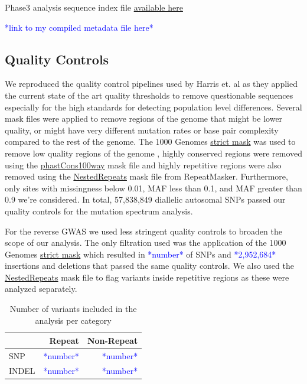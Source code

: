 \documentclass[9pt,lineno]{elife}
\newcommand{\todo}[1]{\textcolor{blue}{*#1*}}
\begin{document}
Phase3 analysis sequence index file  \href{http://ftp.1000genomes.ebi.ac.uk/vol1/ftp/phase3/20130502.phase3.analysis.sequence.index}{available here} 

\todo{link to my compiled metadata file here}

\subsection{Quality Controls}
We reproduced the quality control pipelines used by Harris et. al as they applied the current state of the art quality thresholds to remove questionable sequences especially for the high standards for detecting population level differences. 
Several mask files were applied to remove regions of the genome that might be lower quality, or might have very different mutation rates or base pair complexity compared to the rest of the genome. 
The  1000 Genomes \href{http://ftp.1000genomes.ebi.ac.uk/vol1/ftp/release/20130502/supporting/accessible_genome_masks/20141020.strict_mask.whole_genome.bed}{strict mask} was used to remove low quality regions of the genome , highly conserved regions were removed using the \href{http://hgdownload.cse.ucsc.edu/goldenPath/hg19/database/phastConsElements100way.txt.gz}{phastCons100way} mask file and highly repetitive regions were also removed using the \href{http://hgdownload.cse.ucsc.edu/goldenpath/hg19/database/nestedRepeats.txt.gz}{NestedRepeats} mask file from RepeatMasker. 
Furthermore, only sites with missingness below 0.01, MAF less than 0.1, and MAF greater than 0.9 we're considered.
In total, 57,838,849 diallelic autosomal SNPs passed our quality controls for the mutation spectrum analysis.

For the reverse GWAS we used less stringent quality controls to broaden the scope of our analysis. The only filtration used was the application of the  1000 Genomes \href{http://ftp.1000genomes.ebi.ac.uk/vol1/ftp/release/20130502/supporting/accessible_genome_masks/20141020.strict_mask.whole_genome.bed}{strict mask} which resulted in \todo{number} of SNPs and  \todo{2,952,684} insertions and deletions that passed the same quality controls. We also used the \href{http://hgdownload.cse.ucsc.edu/goldenpath/hg19/database/nestedRepeats.txt.gz}{NestedRepeats} mask file to flag variants inside repetitive regions as these were analyzed separately.

\begin{table}[h]
\begin{tabular}{l  r r}
                      & {Repeat}  & {Non-Repeat}       \\ \hline
{SNP}  & \todo{number} & \todo{number}  \\  
{INDEL} & \todo{number}   & \todo{number}  \\ \hline
\end{tabular}
\caption{Number of variants included in the analysis per category}
\label{totTable}
\end{table}
\end{document}
